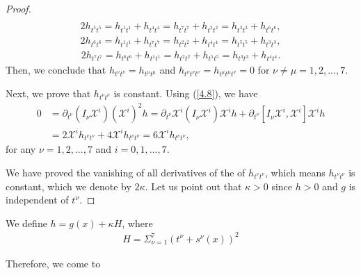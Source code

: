 \documentclass[reqno,12pt]{amsart}
\numberwithin{equation}{section}
\theoremstyle{plain}
\theoremstyle{definition}
\begin{document}
\begin{proof}
{\begin{align*}
      \end{align*}
 \begin{align*}
          2h_{t^5t^5}=h_{t^1t^1}+h_{t^4t^4}=h_{t^7t^7}+h_{t^2t^2}=h_{t^3t^3}+h_{t^6t^6},
      \end{align*}
 \begin{align*}
          2h_{t^6t^6}=h_{t^1t^1}+h_{t^7t^7}=h_{t^2t^2}+h_{t^4t^4}=h_{t^5t^5}+h_{t^3t^3},
      \end{align*}
 \begin{align*}
          2h_{t^7t^7}=h_{t^6t^6}+h_{t^1t^1}=h_{t^2t^2}+h_{t^5t^5}=h_{t^3t^3}+h_{t^4t^4}.
      \end{align*}}
Then, we conclude that $h_{t^\nu t^\nu}=h_{t^\mu t^\mu}$  and $h_{t^\nu t^\nu t^\nu}=h_{t^\mu t^\mu t^\nu}=0$ for $\nu\neq \mu=1,2,...,7$. 

Next, we prove that $h_{t^\nu t^\nu}$ is constant. Using (\ref{4.8}), we have
\begin{align*}
    0&=\partial_{t^\nu}(I_\nu \mathscr{X}^i) (\mathscr{X}^i)^2 h=\partial_{t^\nu}\mathscr{X}^i(I_\nu \mathscr{X}^i)\mathscr{X}^i h+\partial_{t^\nu}[I_\nu \mathscr{X}^i,\mathscr{X}^i]\mathscr{X}^ih\\&=2\mathscr{X}^i h_{t^\nu t^\nu}+4\mathscr{X}^i h_{t^\nu t^\nu}=6\mathscr{X}^i h_{t^\nu t^\nu},
\end{align*}
for any $\nu=1,2,...,7$ and $i=0,1,...,7$.

 We have proved the vanishing of all derivatives of the of $h_{t^\nu t^\nu}$, which means $h_{t^\nu t^\nu}$ is constant, which we denote by $2\kappa$. Let us point out that $\kappa>0$ since $h>0$ and $g$ is independent of $t^\nu$.

\end{proof}

We define $h=g(x)+\kappa H$, where
\begin{align*}
    H=\Sigma_{\nu=1}^7(t^\nu+s^\nu(x))^2\end{align*}

Therefore, we come to
\end{document}
